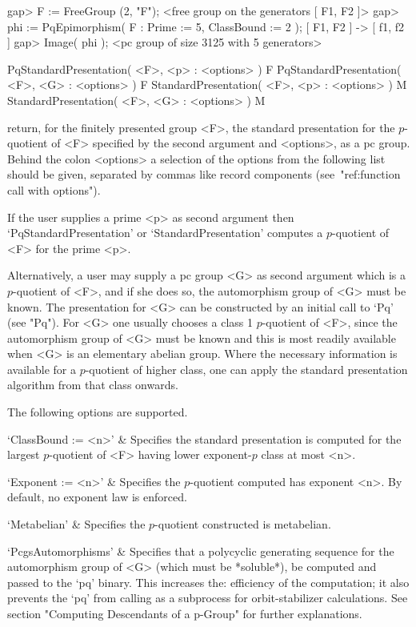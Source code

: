 \beginexample
gap> F := FreeGroup (2, "F");
<free group on the generators [ F1, F2 ]>
gap> phi := PqEpimorphism( F : Prime := 5, ClassBound := 2 );
[ F1, F2 ] -> [ f1, f2 ]
gap> Image( phi );
<pc group of size 3125 with 5 generators>
\endexample


\>PqStandardPresentation( <F>, <p> : <options> ) F
\>PqStandardPresentation( <F>, <G> : <options> ) F
\>StandardPresentation( <F>, <p> : <options> ) M
\>StandardPresentation( <F>, <G> : <options> ) M

return, for the finitely presented group <F>, the  standard  presentation
for the  $p$-quotient  of  <F>  specified  by  the  second  argument  and
<options>, as a pc group. Behind the colon <options> a selection  of  the
options from the following list should be given, separated by commas like
record components (see~"ref:function call with options").

If  the  user  supplies   a   prime   <p>   as   second   argument   then
`PqStandardPresentation'    or    `StandardPresentation'    computes    a
$p$-quotient of <F> for the prime <p>.

Alternatively, a user may supply a pc group <G> as second argument  which
is a $p$-quotient of <F>, and if she does so, the automorphism  group  of
<G> must be known. The presentation for <G>  can  be  constructed  by  an
initial call to `Pq' (see "Pq"). For <G> one usually chooses  a  class  1
$p$-quotient of <F>, since the automorphism group of <G>  must  be  known
and this is most readily available when  <G>  is  an  elementary  abelian
group. Where the necessary information is available for a $p$-quotient of
higher class, one can apply the standard presentation algorithm from that
class onwards.

The following options are supported.

\beginitems
`ClassBound := <n>' &
Specifies  the  standard  presentation  is  computed  for   the   largest
$p$-quotient of <F> having lower expon\-ent-$p$ class at most <n>.

`Exponent := <n>' &
Specifies the $p$-quotient computed has  exponent  <n>.  By  default,  no
exponent law is enforced.

`Metabelian' &
Specifies the $p$-quotient constructed is metabelian.

`PcgsAutomorphisms' &
Specifies that a polycyclic  generating  sequence  for  the  automorphism
group of <G> (which must be *soluble*), be computed  and  passed  to  the
`pq' binary. This increases the: efficiency of the computation;  it  also
prevents  the  `pq'   from   calling   {\GAP}   as   a   subprocess   for
orbit-stabilizer calculations. See section "Computing  Descendants  of  a
p-Group" for further explanations.

